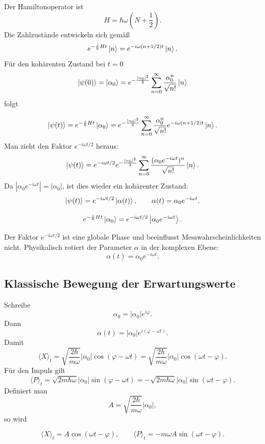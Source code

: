 Der Hamiltonoperator ist
\[
    H=\hbar\omega\left(N+\frac12\right).
\]
Die Zahlzustände entwickeln sich gemäß
\[
    e^{-\frac{i}{\hbar}Ht}\left|n\right\rangle
    =e^{-i\omega(n+1/2)t}\left|n\right\rangle.
\]
Für den kohärenten Zustand bei \(t=0\)
\[
    \left|\psi(0)\right\rangle=\left|\alpha_0\right\rangle
    =e^{-\frac{|\alpha_0|^2}{2}}
    \sum_{n=0}^{\infty}\frac{\alpha_0^n}{\sqrt{n!}}\left|n\right\rangle
\]
folgt
\begin{derivationbox}
\[
    \left|\psi(t)\right\rangle
    =e^{-\frac{i}{\hbar}Ht}\left|\alpha_0\right\rangle
    =e^{-\frac{|\alpha_0|^2}{2}}
    \sum_{n=0}^{\infty}\frac{\alpha_0^n}{\sqrt{n!}}e^{-i\omega(n+1/2)t}\left|n\right\rangle.
\]
Man zieht den Faktor \(e^{-i\omega t/2}\) heraus:
\[
    \left|\psi(t)\right\rangle
    =e^{-i\omega t/2}e^{-\frac{|\alpha_0|^2}{2}}
    \sum_{n=0}^{\infty}\frac{(\alpha_0e^{-i\omega t})^n}{\sqrt{n!}}\left|n\right\rangle.
\]
Da \(|\alpha_0e^{-i\omega t}|=|\alpha_0|\), ist dies wieder ein kohärenter Zustand:
\[
    \left|\psi(t)\right\rangle=e^{-i\omega t/2}\left|\alpha(t)\right\rangle,
    \qquad
    \alpha(t)=\alpha_0e^{-i\omega t}.
\]
\end{derivationbox}

\begin{formulabox}
\[
    e^{-\frac{i}{\hbar}Ht}\left|\alpha_0\right\rangle
    =e^{-i\omega t/2}\left|\alpha_0e^{-i\omega t}\right\rangle.
\]
\end{formulabox}

Der Faktor \(e^{-i\omega t/2}\) ist eine globale Phase und beeinflusst Messwahrscheinlichkeiten nicht. Physikalisch rotiert der Parameter \(\alpha\) in der komplexen Ebene:
\[
    \alpha(t)=\alpha_0e^{-i\omega t}.
\]

\subsection{Klassische Bewegung der Erwartungswerte}

Schreibe
\[
    \alpha_0=|\alpha_0|e^{i\varphi}.
\]
Dann
\[
    \alpha(t)=|\alpha_0|e^{i(\varphi-\omega t)}.
\]
Damit
\[
    \langle X\rangle_t
    =\sqrt{\frac{2\hbar}{m\omega}}|\alpha_0|\cos(\varphi-\omega t)
    =\sqrt{\frac{2\hbar}{m\omega}}|\alpha_0|\cos(\omega t-\varphi).
\]
Für den Impuls gilt
\[
    \langle P\rangle_t
    =\sqrt{2m\hbar\omega}|\alpha_0|\sin(\varphi-\omega t)
    =-\sqrt{2m\hbar\omega}|\alpha_0|\sin(\omega t-\varphi).
\]
Definiert man
\[
    A=\sqrt{\frac{2\hbar}{m\omega}}|\alpha_0|,
\]
so wird
\begin{formulabox}
\[
    \langle X\rangle_t=A\cos(\omega t-\varphi),
    \qquad
    \langle P\rangle_t=-m\omega A\sin(\omega t-\varphi).
\]
\end{formulabox}

